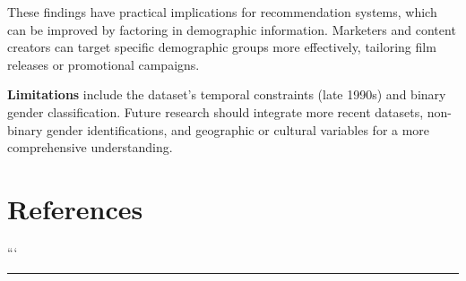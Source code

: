 \documentclass[
  man]{apa6}
\newlength{\cslhangindent}
\newenvironment{CSLReferences}[2] %
 {\begin{list}{}{%
  \setlength{\itemindent}{0pt}
  \setlength{\leftmargin}{0pt}
  \setlength{\parsep}{0pt}
  \ifodd #1
   \setlength{\leftmargin}{\cslhangindent}
   \setlength{\itemindent}{-1\cslhangindent}
  \fi
  \setlength{\itemsep}{#2\baselineskip}}}
 {\end{list}}
\begin{document}
These findings have practical implications for recommendation systems, which can be improved by factoring in demographic information. Marketers and content creators can target specific demographic groups more effectively, tailoring film releases or promotional campaigns.

\textbf{Limitations} include the dataset's temporal constraints (late 1990s) and binary gender classification. Future research should integrate more recent datasets, non-binary gender identifications, and geographic or cultural variables for a more comprehensive understanding.

\section{References}\label{references}

\label{refs}
\begin{CSLReferences}{0}{1}
\end{CSLReferences}

```

\begin{center}\rule{0.5\linewidth}{0.5pt}\end{center}
\end{document}
